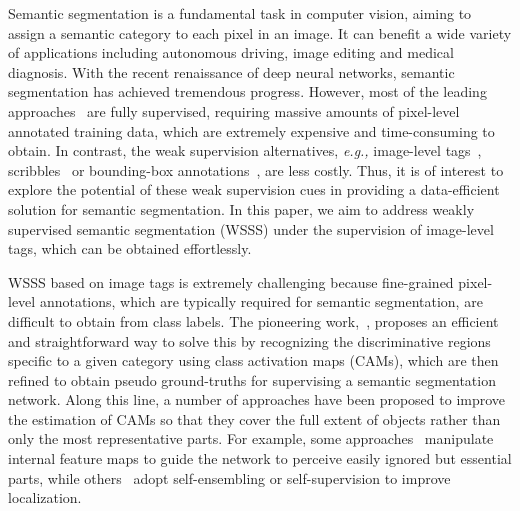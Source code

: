 \documentclass[letterpaper]{article} \usepackage{aaai21}  \usepackage{times}  \usepackage{helvet} \usepackage{courier}  \usepackage[hyphens]{url}  \usepackage{graphicx} \urlstyle{rm} \def\UrlFont{\rm}  \usepackage{graphicx}  \usepackage{natbib}  \usepackage{caption} \frenchspacing  \setlength{\pdfpagewidth}{8.5in}  \setlength{\pdfpageheight}{11in}
\newcommand{\eg}[1]{\textit{e.g.,}}
\begin{document}
Semantic segmentation is a fundamental task in computer vision, aiming to assign a semantic category to each pixel in an image. It can benefit a wide variety of applications including autonomous driving, image editing and medical diagnosis.  With the recent renaissance of deep neural networks, semantic segmentation has achieved tremendous progress. However, most of the leading approaches~\cite{long2015fully,wang2019learning,zhou2020matnet,zhou2020motion} are fully supervised, requiring massive amounts of pixel-level annotated training data, which are extremely expensive and time-consuming to obtain. In contrast, the weak supervision alternatives, \eg, image-level tags~\cite{pathak2015constrained,kolesnikov2016seed,qi2016augmented,wei2016stc,chaudhry2017discovering,ahn2018learning,fan2018associating}, scribbles~\cite{lin2016scribblesup,vernaza2017learning} or bounding-box annotations~\cite{dai2015boxsup,khoreva2017simple,song2019box}, are less costly. Thus, it is of interest to explore the potential of these weak supervision cues in providing a data-efficient solution for semantic segmentation. In this paper, we aim to address weakly supervised semantic segmentation (WSSS) under the supervision of image-level tags, which can be obtained effortlessly.

WSSS based on image tags is extremely challenging because fine-grained pixel-level annotations, which are typically required for semantic segmentation, are difficult to obtain from class labels. The pioneering work,~\cite{zhou2016learning}, proposes an efficient and straightforward way to solve this by recognizing the discriminative regions specific to a given category using class activation maps (CAMs), which are then refined to obtain pseudo ground-truths for supervising a semantic segmentation network. Along this line, a number of approaches have been proposed to improve the estimation of CAMs so that they cover the full extent of objects rather than only the most representative parts. For example, some approaches~\cite{wei2017object,kolesnikov2016seed,choe2019attention} manipulate internal feature maps to guide the network to perceive easily ignored but essential parts, while others~\cite{hou2018self,chang2020weakly,fan2020learning,wang2020self} adopt self-ensembling or self-supervision to improve localization.
\end{document}
